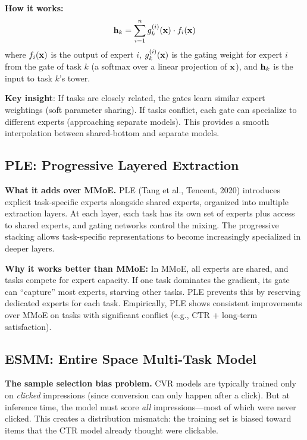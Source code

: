 \textbf{How it works:}
\begin{equation}
\mathbf{h}_k = \sum_{i=1}^{n} g_k^{(i)}(\mathbf{x}) \cdot f_i(\mathbf{x})
\end{equation}
where $f_i(\mathbf{x})$ is the output of expert $i$, $g_k^{(i)}(\mathbf{x})$ is the gating weight for expert $i$ from the gate of task $k$ (a softmax over a linear projection of $\mathbf{x}$), and $\mathbf{h}_k$ is the input to task $k$'s tower.

\textbf{Key insight}: If tasks are closely related, the gates learn similar expert weightings (soft parameter sharing). If tasks conflict, each gate can specialize to different experts (approaching separate models). This provides a smooth interpolation between shared-bottom and separate models.

\subsection{PLE: Progressive Layered Extraction}

\textbf{What it adds over MMoE.} PLE (Tang et al., Tencent, 2020) introduces explicit task-specific experts alongside shared experts, organized into multiple extraction layers. At each layer, each task has its own set of experts plus access to shared experts, and gating networks control the mixing. The progressive stacking allows task-specific representations to become increasingly specialized in deeper layers.

\textbf{Why it works better than MMoE:} In MMoE, all experts are shared, and tasks compete for expert capacity. If one task dominates the gradient, its gate can ``capture'' most experts, starving other tasks. PLE prevents this by reserving dedicated experts for each task. Empirically, PLE shows consistent improvements over MMoE on tasks with significant conflict (e.g., CTR + long-term satisfaction).

\subsection{ESMM: Entire Space Multi-Task Model}

\textbf{The sample selection bias problem.} CVR models are typically trained only on \textit{clicked} impressions (since conversion can only happen after a click). But at inference time, the model must score \textit{all} impressions---most of which were never clicked. This creates a distribution mismatch: the training set is biased toward items that the CTR model already thought were clickable.

